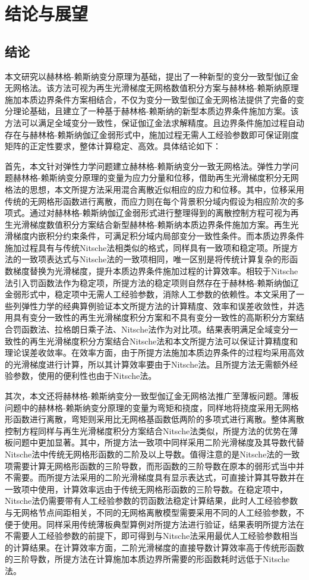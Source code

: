 \chapter{结论与展望}
\section{结论}
本文研究以赫林格-赖斯纳变分原理为基础，提出了一种新型的变分一致型伽辽金无网格法。该方法可视为再生光滑梯度无网格数值积分方案与赫林格-赖斯纳原理施加本质边界条件方案相结合，不仅为变分一致型伽辽金无网格法提供了完备的变分理论基础，且建立了一种基于赫林格-赖斯纳的新型本质边界条件施加方案。该方法可以满足全域变分一致性，保证伽辽金法求解精度。且边界条件施加过程自动存在与赫林格-赖斯纳伽辽金弱形式中，施加过程无需人工经验参数即可保证刚度矩阵的正定性要求，整体计算稳定、高效。具体结论如下：

首先，本文针对弹性力学问题建立赫林格-赖斯纳变分一致无网格法。弹性力学问题赫林格-赖斯纳变分原理的变量为应力分量和位移，借助再生光滑梯度积分无网格法的思想，本文所提方法采用混合离散近似相应的应力和位移。其中，位移采用传统的无网格形函数进行离散，而应力则在每个背景积分域内假设为相应阶次的多项式。通过对赫林格-赖斯纳伽辽金弱形式进行整理得到的离散控制方程可视为再生光滑梯度数值积分方案结合新型赫林格-赖斯纳本质边界条件施加方案。再生光滑梯度内嵌积分约束条件，可满足积分域内局部变分一致性条件。而本质边界条件施加过程具有与传统Nitsche法相类似的格式，同样具有一致项和稳定项。所提方法的一致项表达式与Nitsche法的一致项相同，唯一区别是将传统计算复杂的形函数梯度替换为光滑梯度，提升本质边界条件施加过程的计算效率。相较于Nitsche法引入罚函数法作为稳定项，所提方法的稳定项则自然存在于赫林格-赖斯纳伽辽金弱形式中，稳定项中无需人工经验参数，消除人工参数的依赖性。本文采用了一些列弹性力学的经典算例验证本文所提方法的计算精度、效率和误差收敛性，并选用具有变分一致性的再生光滑梯度积分方案和不具有变分一致性的高斯积分方案结合罚函数法、拉格朗日乘子法、Nitsche法作为对比项。结果表明满足全域变分一致性的再生光滑梯度积分方案结合Nitsche法和本文所提方法可以保证计算精度和理论误差收敛率。在效率方面，由于所提方法施加本质边界条件的过程均采用高效的光滑梯度进行计算，所以其计算效率要由于Nitsche法。且所提方法无需额外经验参数，使用的便利性也由于Nitsche法。

其次，本文还将赫林格-赖斯纳变分一致型伽辽金无网格法推广至薄板问题。薄板问题中的赫林格-赖斯纳变分原理的变量为弯矩和挠度，同样地将挠度采用无网格形函数进行离散，弯矩则采用比无网格基函数低两阶的多项式进行离散。整体离散控制方程同样与再生光滑梯度积分方案结合Nitsche法类似，所提方法的优势在薄板问题中更加显著。其中，所提方法一致项中同样采用二阶光滑梯度及其导数代替Nitsche法中传统无网格形函数的二阶及以上导数。值得注意的是Nitsche法的一致项需要计算无网格形函数的三阶导数，而形函数的三阶导数在原本的弱形式当中并不需要。而所提方法采用的二阶光滑梯度具有显示表达式，可直接计算其导数并在一致项中使用，计算效率远由于传统无网格形函数的三阶导数。在稳定项中，Nitsche法仍需要带有人工经验参数的罚函数法稳定计算结果，此时人工经验参数与无网格节点间距相关，不同的无网格离散模型需要采用不同的人工经验参数，不便于使用。同样采用传统薄板典型算例对所提方法进行验证，结果表明所提方法在不需要人工经验参数的前提下，即可得到与Nitsche法采用最优人工经验参数相当的计算结果。在计算效率方面，二阶光滑梯度的直接导数计算效率高于传统形函数的三阶导数，所提方法在计算施加本质边界所需要的形函数耗时远低于Nitsche法。

